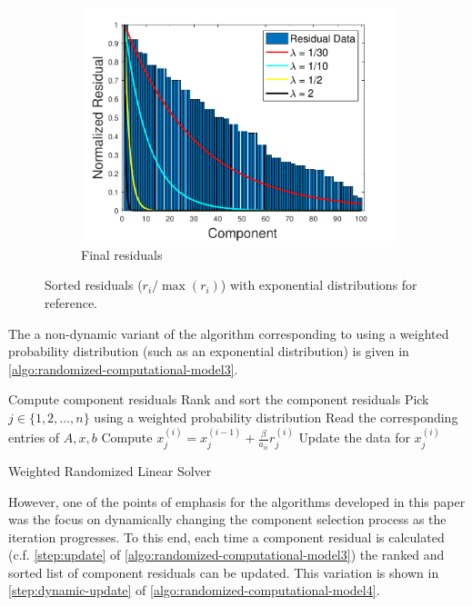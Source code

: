 \documentclass{article}
\theoremstyle{definition}
\theoremstyle{example}
\theoremstyle{example}
\theoremstyle{example}
\begin{document}
\begin{figure}[ht!]
\begin{subfigure}{0.33\linewidth}
		\includegraphics[width=\textwidth]{images/exp_dist_overlay_final.pdf}
		\caption{Final residuals}
		\label{exp_dist_final}
	\end{subfigure}
	
	\caption{Sorted residuals ($r_i / \max (r_i)$) with exponential distributions for reference.}
	\label{fig:distribution-residuals}
\end{figure}

The a non-dynamic variant of the algorithm corresponding to using a weighted probability distribution (such as an exponential distribution) is given in \cref{algo:randomized-computational-model3}.

\begin{algorithm}[ht!]
	\DontPrintSemicolon
	Compute component residuals \;
	Rank and sort the component residuals \;
	 {
		 {
			Pick $j \in \{1, 2, \ldots, n\}$ using a weighted probability distribution \; \label{alg:pickrandom3}
			Read the corresponding entries of $A, x, b$ \label{step:read3}\;
			Compute $x^{(i)}_j = x^{(i-1)}_j + \frac{\beta}{a_{ii}} r^{(i)}_j$ \label{step:update} \;
			Update the data for $x^{(i)}_j$ \;
		}
	}
	\caption{Weighted Randomized Linear Solver}
	\label{algo:randomized-computational-model3}
\end{algorithm}

However, one of the points of emphasis for the algorithms developed in this paper was the focus on dynamically changing the component selection process as the iteration progresses. To this end, each time a component residual is calculated (c.f. \cref{step:update} of \cref{algo:randomized-computational-model3}) the ranked and sorted list of component residuals can be updated. This variation is shown in \cref{step:dynamic-update} of \cref{algo:randomized-computational-model4}.
\end{document}
